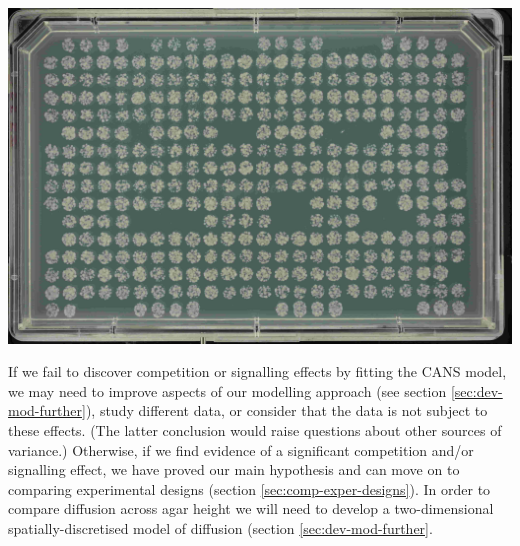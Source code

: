 \begin{Figure}
  \centering
  \includegraphics[width=\linewidth]{DLR00012647-2009-07-02_23-12-49}
  \label{fig:gaps}
\end{Figure}

If we fail to discover competition or signalling effects by fitting
the CANS model, we may need to improve aspects of our modelling
approach (see section \ref{sec:dev-mod-further}), study different
data, or consider that the data is not subject to these effects. (The
latter conclusion would raise questions about other sources of
variance.) Otherwise, if we find evidence of a significant competition
and/or signalling effect, we have proved our main hypothesis and can
move on to comparing experimental designs (section
\ref{sec:comp-exper-designs}). In order to compare diffusion across
agar height we will need to develop a two-dimensional
spatially-discretised model of diffusion (section
\ref{sec:dev-mod-further}.

